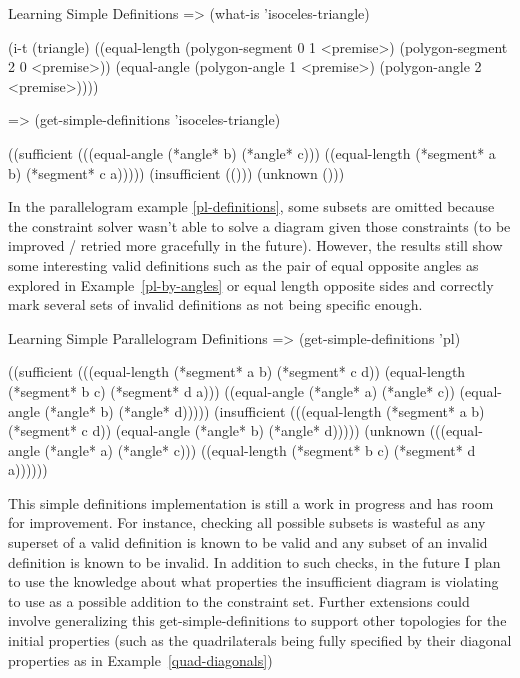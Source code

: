 \begin{repl-example}
[label=simple-definitions]
{Learning Simple Definitions}
=> (what-is 'isoceles-triangle)

(i-t
 (triangle)
 ((equal-length (polygon-segment 0 1 <premise>)
                (polygon-segment 2 0 <premise>))
  (equal-angle (polygon-angle 1 <premise>) (polygon-angle 2 <premise>))))

=> (get-simple-definitions 'isoceles-triangle)

((sufficient
  (((equal-angle (*angle* b) (*angle* c)))
   ((equal-length (*segment* a b) (*segment* c a)))))
 (insufficient (()))
 (unknown ()))
\end{repl-example}

In the parallelogram example \ref{pl-definitions}, some subsets are
omitted because the constraint solver wasn't able to solve a diagram
given those constraints (to be improved / retried more gracefully in
the future). However, the results still show some interesting valid
definitions such as the pair of equal opposite angles as explored in
Example~\ref{pl-by-angles} or equal length opposite sides and
correctly mark several sets of invalid definitions as not being
specific enough.

\begin{repl-example}
[label=pl-definitions]
{Learning Simple Parallelogram Definitions}
=> (get-simple-definitions 'pl)

((sufficient
  (((equal-length (*segment* a b) (*segment* c d))
    (equal-length (*segment* b c) (*segment* d a)))
   ((equal-angle (*angle* a) (*angle* c))
    (equal-angle (*angle* b) (*angle* d)))))
 (insufficient
  (((equal-length (*segment* a b) (*segment* c d))
    (equal-angle (*angle* b) (*angle* d)))))
 (unknown
  (((equal-angle (*angle* a) (*angle* c)))
   ((equal-length (*segment* b c) (*segment* d a))))))
\end{repl-example}

This simple definitions implementation is still a work in progress and
has room for improvement. For instance, checking all possible subsets
is wasteful as any superset of a valid definition is known to be valid
and any subset of an invalid definition is known to be invalid. In
addition to such checks, in the future I plan to use the knowledge
about what properties the insufficient diagram is violating to use as
a possible addition to the constraint set. Further extensions could
involve generalizing this get-simple-definitions to support other
topologies for the initial properties (such as the quadrilaterals
being fully specified by their diagonal properties as in
Example~\ref{quad-diagonals})
